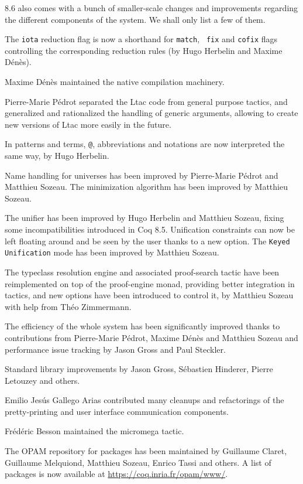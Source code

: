 {\Coq} 8.6 also comes with a bunch of smaller-scale changes and
improvements regarding the different components of the system. We shall
only list a few of them.

The {\tt iota} reduction flag is now a shorthand for {\tt match}, {\tt
  fix} and {\tt cofix} flags controlling the corresponding reduction
rules (by Hugo Herbelin and Maxime Dénès).

Maxime Dénès maintained the native compilation machinery.

Pierre-Marie Pédrot separated the Ltac code from general purpose
tactics, and generalized and rationalized the handling of generic
arguments, allowing to create new versions of Ltac more easily in the
future.

In patterns and terms, {\tt @}, abbreviations and notations are now
interpreted the same way, by Hugo Herbelin.

Name handling for universes has been improved by Pierre-Marie Pédrot and
Matthieu Sozeau. The minimization algorithm has been improved by
Matthieu Sozeau.

The unifier has been improved by Hugo Herbelin and Matthieu Sozeau,
fixing some incompatibilities introduced in Coq 8.5. Unification
constraints can now be left floating around and be seen by the user
thanks to a new option. The {\tt Keyed Unification} mode has been
improved by Matthieu Sozeau. 

The typeclass resolution engine and associated proof-search tactic have
been reimplemented on top of the proof-engine monad, providing better
integration in tactics, and new options have been introduced to control
it, by Matthieu Sozeau with help from Théo Zimmermann.

The efficiency of the whole system has been significantly improved
thanks to contributions from Pierre-Marie Pédrot, Maxime Dénès and
Matthieu Sozeau and performance issue tracking by Jason Gross and Paul
Steckler.

Standard library improvements by Jason Gross, Sébastien Hinderer, Pierre
Letouzey and others.

Emilio Jesús Gallego Arias contributed many cleanups and refactorings of
the pretty-printing and user interface communication components.

Frédéric Besson maintained the micromega tactic.

The OPAM repository for {\Coq} packages has been maintained by Guillaume
Claret, Guillaume Melquiond, Matthieu Sozeau, Enrico Tassi and others. A
list of packages is now available at \url{https://coq.inria.fr/opam/www/}.

